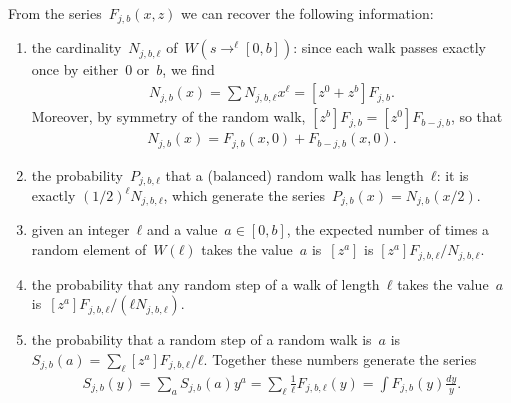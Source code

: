 \documentclass{article}
\begin{document}
From the series~$F_{j,b}(x,z)$ we can recover the following information:
\begin{enumerate}
\item the cardinality~$N_{j,b,ℓ}$ of~$W(s→^{ℓ}[0,b])$:
since each walk passes exactly once by either~$0$ or~$b$,
we find
\begin{align}
N_{j,b}(x) = ∑ N_{j,b,ℓ} x^{ℓ} = [z^0 + z^b] F_{j,b}.
\end{align}
Moreover, by symmetry of the random walk,
$[z^b] F_{j,b} = [z^0] F_{b-j,b}$, so that
\begin{align}
N_{j,b}(x) = F_{j,b}(x,0) + F_{b-j,b}(x,0).
\end{align}
\item the probability~$P_{j,b,ℓ}$ that
a (balanced) random walk has length~$ℓ$:
it is exactly $(1/2)^{ℓ} N_{j,b,ℓ}$,
which generate the series~$P_{j,b}(x) = N_{j,b}(x/2)$.
\item given an integer~$ℓ$ and a value~$a ∈ [0,b]$,
the expected number of times a random element of~$W(ℓ)$
takes the value~$a$ is~$[z^a]$
is $[z^a] F_{j,b,ℓ}/N_{j,b,ℓ}$.
\item the probability that any random step of a walk of length~$ℓ$
takes the value~$a$
is~$[z^a] F_{j,b,ℓ}/(ℓ N_{j,b,ℓ})$.
\item the probability that a random step of a random walk is~$a$
is~$S_{j,b}(a) = ∑_{ℓ} [z^a] F_{j,b,ℓ}/ℓ$.
Together these numbers generate the series
\begin{align}
S_{j,b}(y) = ∑_{a} S_{j,b}(a) y^a
 = ∑_{ℓ} \frac{1}{ℓ} F_{j,b,ℓ}(y)
 = ∫ F_{j,b}(y) \frac{d y}{y}.
\end{align}
\end{enumerate}
\end{document}
